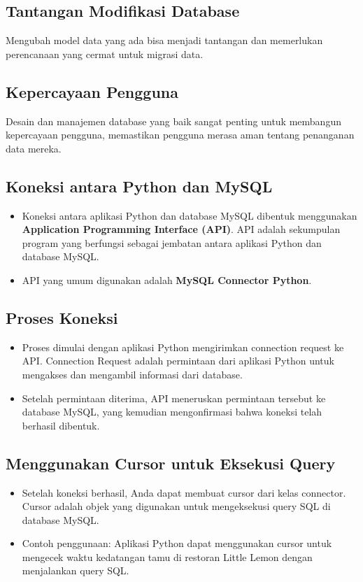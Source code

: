 \documentclass{article}
\begin{document}
\subsection{Tantangan Modifikasi Database}
Mengubah model data yang ada bisa menjadi tantangan dan memerlukan perencanaan yang cermat untuk migrasi data.

\subsection{Kepercayaan Pengguna}
Desain dan manajemen database yang baik sangat penting untuk membangun kepercayaan pengguna, memastikan pengguna merasa aman tentang penanganan data mereka.

\subsection{Koneksi antara Python dan MySQL}
\begin{itemize}
      \item Koneksi antara aplikasi Python dan database MySQL dibentuk menggunakan \textbf{Application Programming Interface (API)}. API adalah sekumpulan program yang berfungsi sebagai jembatan antara aplikasi Python dan database MySQL.
      \item API yang umum digunakan adalah \textbf{MySQL Connector Python}.
\end{itemize}

\subsection{Proses Koneksi}

\begin{itemize}
      \item Proses dimulai dengan aplikasi Python mengirimkan connection request ke API. Connection Request adalah permintaan dari aplikasi Python untuk mengakses dan mengambil informasi dari database.
      \item Setelah permintaan diterima, API meneruskan permintaan tersebut ke database MySQL, yang kemudian mengonfirmasi bahwa koneksi telah berhasil dibentuk.
\end{itemize}

\subsection{Menggunakan Cursor untuk Eksekusi Query}
\begin{itemize}
      \item Setelah koneksi berhasil, Anda dapat membuat cursor dari kelas connector. Cursor adalah objek yang digunakan untuk mengeksekusi query SQL di database MySQL.
      \item Contoh penggunaan: Aplikasi Python dapat menggunakan cursor untuk mengecek waktu kedatangan tamu di restoran Little Lemon dengan menjalankan query SQL.
\end{itemize}
\end{document}
